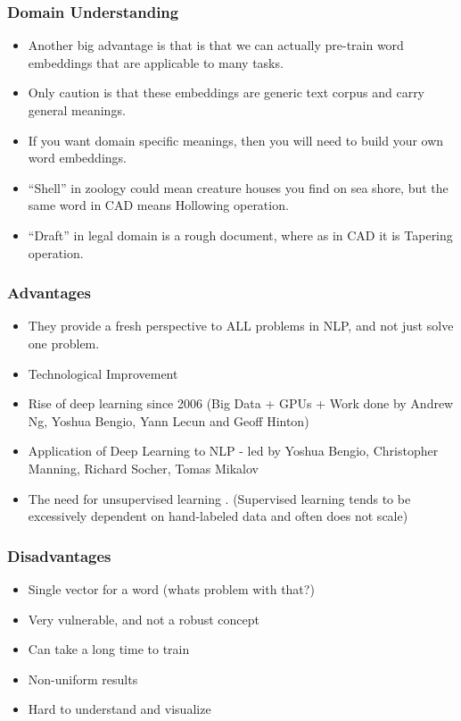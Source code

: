 \begin{frame}[fragile]\frametitle{Domain Understanding}
  \begin{itemize}
    \item Another big advantage is that  is that we can actually pre-train word embeddings that are applicable to many tasks. 
	\item Only caution is that these embeddings are generic text corpus and carry general meanings.
	\item If you want domain specific meanings, then you will need to build your own word embeddings.
	\item ``Shell'' in zoology could mean creature houses you find on sea shore, but the same word in CAD means Hollowing operation.
	\item ``Draft'' in legal domain is a rough document, where as in CAD it is Tapering operation.
  \end{itemize}



\end{frame}


\begin{frame}[fragile]\frametitle{Advantages}

\begin{itemize}
\item They provide a fresh perspective to ALL  problems in NLP, and not just solve one problem.
\item Technological Improvement
\item Rise of deep learning since 2006 (Big Data + GPUs  + Work done by Andrew Ng, Yoshua Bengio, Yann Lecun and Geoff Hinton)
\item Application of Deep Learning to NLP - led by Yoshua Bengio,  Christopher Manning, Richard Socher, Tomas Mikalov
\item The need for unsupervised learning . (Supervised learning tends to be excessively dependent on hand-labeled data and often does not scale)
\end{itemize}
\end{frame}



\begin{frame}[fragile]\frametitle{Disadvantages}
\begin{itemize}
\item Single vector for a word (whats problem with that?)
\item Very vulnerable, and not a robust concept
\item Can take a long time to train
\item Non-uniform results
\item Hard to understand and visualize
\end{itemize}
\end{frame}

